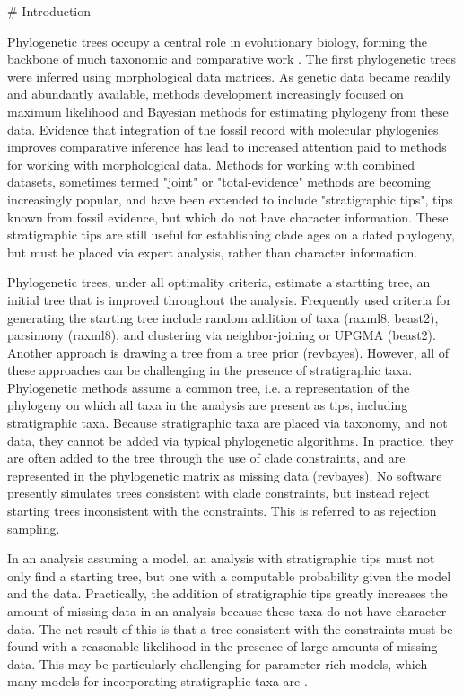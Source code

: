# Introduction

Phylogenetic trees occupy a central role in evolutionary biology, forming the backbone of much taxonomic \citep{Sneath1973} and comparative work \citep{Felsenstein1985a}. 
The first phylogenetic trees were inferred using morphological data matrices.
As genetic data became readily and abundantly available, methods development increasingly focused on maximum likelihood and Bayesian methods for estimating phylogeny from these data.
Evidence that integration of the fossil record with molecular phylogenies improves comparative inference has lead to increased attention paid to methods for working with morphological data.
Methods for working with combined datasets, sometimes termed "joint" or "total-evidence" methods are becoming increasingly popular, and have been extended to include "stratigraphic tips", tips known from fossil evidence, but which do not have character information.
These stratigraphic tips are still useful for establishing clade ages on a dated phylogeny, but must be placed via expert analysis, rather than character information.

Phylogenetic trees, under all optimality criteria, estimate a startting tree, an initial tree that is improved throughout the analysis.
Frequently used criteria for generating the starting tree include random addition of taxa (raxml8, beast2), parsimony (raxml8), and clustering via neighbor-joining or UPGMA (beast2).
Another approach is drawing a tree from a tree prior (revbayes).
However, all of these approaches can be challenging in the presence of stratigraphic taxa. 
Phylogenetic methods assume a common tree, i.e. a representation of the phylogeny on which all taxa in the analysis are present as tips, including stratigraphic taxa.
Because stratigraphic taxa are placed via taxonomy, and not data, they cannot be added via typical phylogenetic algorithms.
In practice, they are often added to the tree through the use of clade constraints, and are represented in the phylogenetic matrix as missing data (revbayes).
No software presently simulates trees consistent with clade constraints, but instead reject starting trees inconsistent with the constraints.
This is referred to as rejection sampling.

In an analysis assuming a model, an analysis with stratigraphic tips must not only find a starting tree, but one with a computable probability given the model and the data.
Practically, the addition of stratigraphic tips greatly increases the amount of missing data in an analysis because these taxa do not have character data.
The net result of this is that a tree consistent with the constraints must be found with a reasonable likelihood in the presence of large amounts of missing data.
This may be particularly challenging for parameter-rich models, which many models for incorporating stratigraphic taxa are \citep{fbd}.

